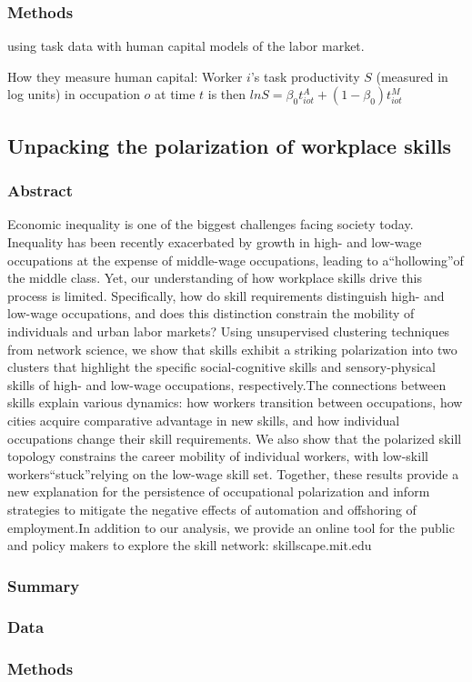\documentclass[12pt]{article}
\begin{document}
\subsubsection*{Methods}

using task data with human capital models of the labor market.

How they measure human capital:  Worker $i$'s task productivity $S$ (measured in log units) in occupation $o$ at time $t$ is then $ln{S} = \beta_0t^{A}_{iot} + (1-\beta_0)t^M_{iot}$



\subsection*{Unpacking the polarization of workplace skills\cite{unpacking_the_polarization}}

\subsubsection*{Abstract}
Economic inequality is one of the biggest challenges facing society today. Inequality has been recently exacerbated by growth in high- and low-wage occupations at the expense of middle-wage occupations, leading to a“hollowing”of the middle class. Yet, our understanding of how workplace skills drive this process is limited. Specifically, how do skill requirements distinguish high- and low-wage occupations, and does this distinction constrain the mobility of individuals and urban labor markets? Using unsupervised clustering techniques from network science, we show that skills exhibit a striking polarization into two clusters that highlight the specific social-cognitive skills and sensory-physical skills of high- and low-wage occupations, respectively.The connections between skills explain various dynamics: how workers transition between occupations, how cities acquire comparative advantage in new skills, and how individual occupations change their skill requirements. We also show that the polarized skill topology constrains the career mobility of individual workers, with low-skill workers“stuck”relying on the low-wage skill set. Together, these results provide a new explanation for the persistence of occupational polarization and inform strategies to mitigate the negative effects of automation and offshoring of employment.In addition to our analysis, we provide an online tool for the public and policy makers to explore the skill network: skillscape.mit.edu
\subsubsection*{Summary}

\subsubsection*{Data}

\subsubsection*{Methods}


\end{document}
